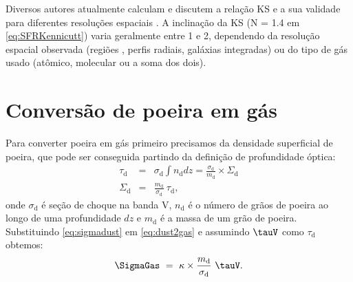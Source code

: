Diversos autores atualmente calculam e discutem a relação KS e a sua validade para diferentes
resoluções espaciais \citep[e.g., ][]{Kennicutt.etal.2007a, Leroy.etal.2012a,
Calzetti.Liu.Koda.2012a, Lada.etal.2013a, Tacconi.etal.2013a, Casasola.etal.2015a}. A inclinação
da KS (N = 1.4 em \eqref{eq:SFRKennicutt}) varia geralmente entre 1 e 2, dependendo da resolução
espacial observada (regiões \Hii, perfis radiais, galáxias integradas) ou do tipo de gás usado
(atômico, molecular ou a soma dos dois).

\section{Conversão de poeira em gás}
\label{sec:gasfrac:gas2dust}

Para converter poeira em gás primeiro precisamos da densidade superficial de poeira, que pode ser
conseguida partindo da definição de profundidade óptica:
\begin{eqnarray}
	\tau_{\mathrm{d}} &=& \sigma_{\mathrm{d}} \int n_{\mathrm{d}} dz =
	\frac{\sigma_{\mathrm{d}}}{m_{\mathrm{d}}}\times\Sigma_{\mathrm{d}}
	\\
	\Sigma_{\mathrm{d}} &=& \frac{m_{\mathrm{d}}}{\sigma_{\mathrm{d}}}\ \tau_{\mathrm{d}},
	\label{eq:sigmadust}
\end{eqnarray}
\noindent onde $\sigma_{\mathrm{d}}$ é seção de choque na banda V, $n_{\mathrm{d}}$ é o número de
grãos de poeira ao longo de uma profundidade $dz$ e $m_{\mathrm{d}}$ é a massa de um grão de poeira.
Substituindo \eqref{eq:sigmadust} em \eqref{eq:dust2gas} e assumindo $\tauV$ como $\tau_{\mathrm{d}}$ obtemos:
\begin{equation}
	\SigmaGas\ =\ \kappa \times \frac{m_{\mathrm{d}}}{\sigma_{\mathrm{d}}}\ \tauV. 
	\label{eq:dust2gas_tauV}
\end{equation}


